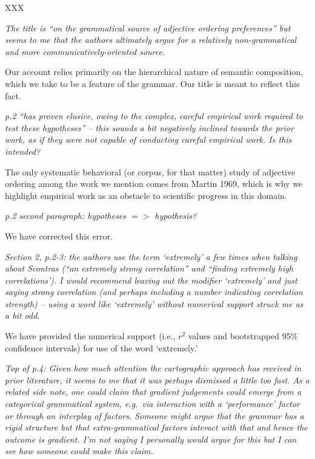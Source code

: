 \documentclass[12pt]{article}
\begin{document}
XXX

\item \emph{The title is ``on the grammatical source of adjective ordering
preferences'' but seems to me that the authors ultimately argue for a
relatively non-grammatical and more communicatively-oriented source.}

Our account relies primarily on the hierarchical nature of semantic composition, which we take to be a feature of the grammar. Our title is meant to reflect this fact.

\item \emph{p.2 ``has proven elusive, owing to the complex, careful empirical work
required to test these hypotheses'' – this sounds a bit negatively
inclined towards the prior work, as if they were not capable of conducting
careful empirical work. Is this intended?}

The only systematic behavioral (or corpus, for that matter) study of adjective ordering among the work we mention comes from Martin 1969, which is why we highlight empirical work as an obstacle to scientific progress in this domain.

\item \emph{p.2 second paragraph: hypotheses $=>$ hypothesis?}

We have corrected this error.

\item \emph{Section 2, p.2-3: the authors use the term `extremely' a few times when
talking about Scontras (``an extremely strong correlation'' and ``finding
extremely high correlations').  I would recommend leaving out the modifier
`extremely' and just saying strong correlation (and perhaps including a
number indicating correlation strength) – using a word like
`extremely' without numerical support struck me as a bit odd.}

We have provided the numerical support (i.e., $r^2$ values and bootstrapped 95\% confidence intervals) for use of the word `extremely.'

\item \emph{Top of p.4: Given how much attention the cartographic approach has received in prior literature, it seems to me that it was perhaps dismissed a little too fast. As a related side note, one could claim that gradient judgements
could emerge from a categorical grammatical system, e.g.~via interaction with
a `performance' factor or through an interplay of factors. Someone might
argue that the grammar has a rigid structure but that extra-grammatical
factors interact with that and hence the outcome is gradient. I'm not
saying I personally would argue for this but I can see how someone could
make this claim.}
\end{document}
